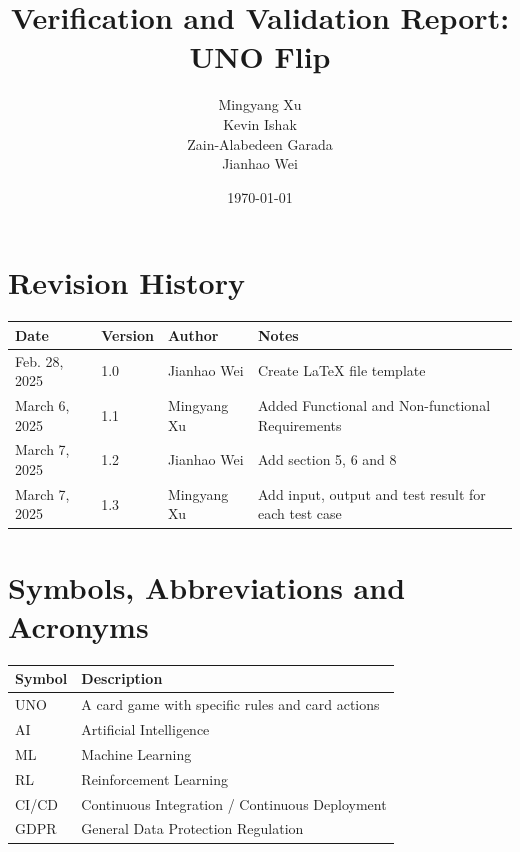 \documentclass[12pt, titlepage]{article}
\begin{document}
\title{Verification and Validation Report: UNO Flip}
\author{Mingyang Xu\\ Kevin Ishak\\ Zain-Alabedeen Garada\\ Jianhao Wei\\}

\date{\today}

\maketitle


\section{Revision History}

\begin{tabularx}{\textwidth}{p{3cm}p{2cm}p{2cm}X}
\toprule {\bf Date} & {\bf Version} & {\bf Author}& {\bf Notes}\\
\midrule
Feb. 28, 2025 & 1.0 & Jianhao Wei & Create LaTeX file template \\
March 6, 2025 & 1.1 & Mingyang Xu & Added Functional and Non-functional Requirements\\
March 7, 2025 & 1.2 & Jianhao Wei & Add section 5, 6 and 8\\
March 7, 2025 & 1.3 & Mingyang Xu & Add input, output and test result for each test case\\

\bottomrule
\end{tabularx}

\newpage

\section{Symbols, Abbreviations and Acronyms}

\renewcommand{\arraystretch}{1.2}
\begin{tabular}{l l} 
  \toprule		
  \textbf{Symbol} & \textbf{Description}\\
  \midrule 
  UNO & A card game with specific rules and card actions\\
  AI & Artificial Intelligence\\
  ML & Machine Learning\\
  RL & Reinforcement Learning\\
  CI/CD & Continuous Integration / Continuous Deployment\\
  GDPR & General Data Protection Regulation\\
  \bottomrule
\end{tabular}\
\end{document}
